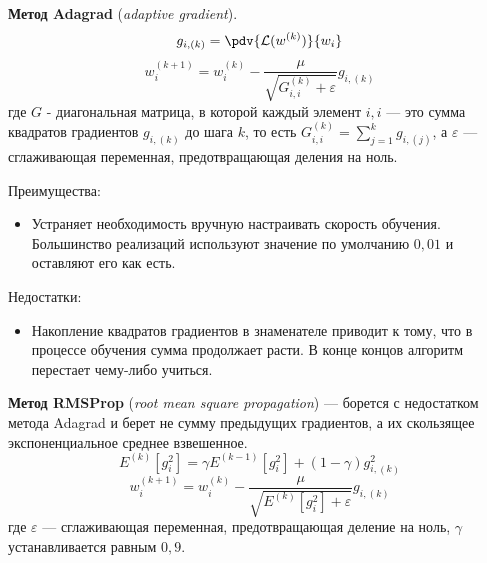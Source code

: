 \begin{definition}
    \textbf{Метод Adagrad} (\textit{adaptive gradient}).
    \[
        g_{i,(k)}=\pdv{\mathcal{L}(w^{(k)})}{w_i}
    \]
    \[
        w_i^{(k+1)}=w_i^{(k)}-\dfrac{\mu}{\sqrt{G_{i,i}^{(k)}+\varepsilon}}g_{i,(k)}
    \]
    где $G$ - диагональная матрица, в которой каждый элемент $i,i$ --- это сумма квадратов градиентов $g_{i,(k)}$ до шага $k$, то есть $G_{i,i}^{(k)}=\sum_{j=1}^kg_{i,(j)}$, а $\varepsilon$ --- сглаживающая переменная, предотвращающая деления на ноль.
\end{definition}

Преимущества:
\begin{itemize}
    \item Устраняет необходимость вручную настраивать скорость обучения. Большинство реализаций используют значение по умолчанию $0,01$ и оставляют его как есть.
\end{itemize}

Недостатки:
\begin{itemize}
    \item Накопление квадратов градиентов в знаменателе приводит к тому, что в процессе обучения сумма продолжает расти. В конце концов алгоритм перестает чему-либо учиться.
\end{itemize}

\begin{definition}
    \textbf{Метод RMSProp} (\textit{root mean square propagation}) --- борется с недостатком метода Adagrad и берет не сумму предыдущих градиентов, а их скользящее экспоненциальное среднее взвешенное.
    \[
        E^{(k)}[g_i^2]=\gamma E^{(k-1)}[g_i^2]+(1-\gamma)g^2_{i,(k)}
    \]
    \[
        w_i^{(k+1)}=w_i^{(k)}-\dfrac{\mu}{\sqrt{E^{(k)}[g_i^2]+\varepsilon}}g_{i,(k)}
    \]
    где $\varepsilon$ --- сглаживающая переменная, предотвращающая деление на ноль, $\gamma$ устанавливается равным $0,9$.
\end{definition}


